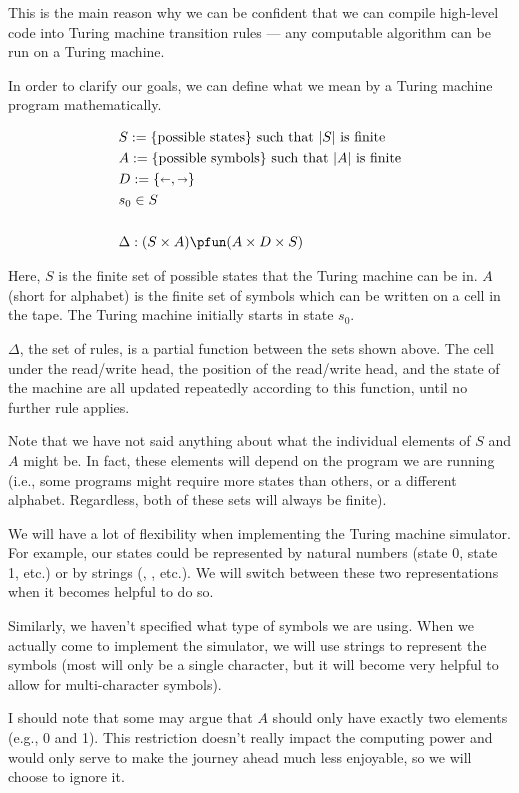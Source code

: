 This is the main reason why we can be confident that we can compile high-level code into Turing machine transition rules --- any computable algorithm can be run on a Turing machine.

In order to clarify our goals, we can define what we mean by a Turing machine program mathematically.

\begin{align*}
    &S:=\{\textrm{possible states}\} \textrm{ such that }|S|\textrm{ is finite} \\
    &A:=\{\textrm{possible symbols}\} \textrm{ such that }|A|\textrm{ is finite} \\
    &D:=\{\shortleftarrow, \shortrightarrow\}\\
    &s_0 \in S\\
    \\
    &\Delta: (S\times A) \pfun (A \times D \times S)
\end{align*}

Here, $S$ is the finite set of possible states that the Turing machine can be in. $A$ (short for alphabet) is the finite set of symbols which can be written on a cell in the tape. The Turing machine initially starts in state $s_0$.

$\Delta$, the set of rules, is a partial function between the sets shown above. The cell under the read/write head, the position of the read/write head, and the state of the machine are all updated repeatedly according to this function, until no further rule applies.

Note that we have not said anything about what the individual elements of $S$ and $A$ might be. In fact, these elements will depend on the program we are running (i.e., some programs might require more states than others, or a different alphabet. Regardless, both of these sets will always be finite).

We will have a lot of flexibility when implementing the Turing machine simulator. For example, our states could be represented by natural numbers (state 0, state 1, etc.) or by strings (, , etc.). We will switch between these two representations when it becomes helpful to do so.

Similarly, we haven't specified what type of symbols we are using. When we actually come to implement the simulator, we will use strings to represent the symbols (most will only be a single character, but it will become very helpful to allow for multi-character symbols).

I should note that some may argue that $A$ should only have exactly two elements (e.g., 0 and 1). This restriction doesn't really impact the computing power and would only serve to make the journey ahead much less enjoyable, so we will choose to ignore it.
